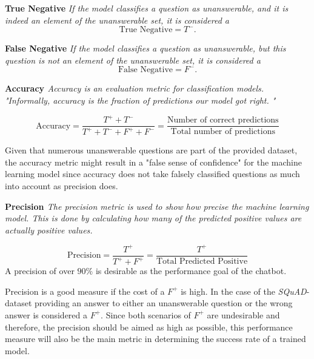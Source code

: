         \begin{tcolorbox}
            \textbf{True Negative}
            \textit{If the model classifies a question as unanswerable, and it is indeed an element of the unanswerable set, it is considered a}
            $$\text{True Negative} = T^-.$$
        \end{tcolorbox}

        \begin{tcolorbox}
            \textbf{False Negative}
            \textit{If the model classifies a question as unanswerable, but this question is not an element of the unanswerable set, it is considered a}
            $$\text{False Negative} = F^-.$$
        \end{tcolorbox}

        \begin{tcolorbox}
            \textbf{Accuracy \cite{googleClassificationAccuracy}}
            \textit{Accuracy is an evaluation metric for classification models. "Informally, accuracy is the fraction of predictions our model got right. \cite{googleClassificationAccuracy}"}

            $$\text{Accuracy} = \frac{T^+ + T^-}{T^+ + T^- + F^+ + F^-} = \frac{\text{Number of correct predictions}}{\text{Total number of predictions}}$$

            Given that numerous unanswerable questions are part of the provided dataset, the accuracy metric might result in a "false sense of confidence" for the machine learning model since accuracy does not take falsely classified questions as much into account as precision does.
        \end{tcolorbox}

        

        \begin{tcolorbox}
            \textbf{Precision \cite{koehrsenPrecisionRecall}}
            \textit{The precision metric is used to show how precise the machine learning model. 
                This is done by calculating how many of the predicted positive values are actually positive values.
            }

            $$\text{Precision} = \frac{T^+}{T^+ + F^+} = \frac{T^+}{\text{Total Predicted Positive}}$$
            A precision of over $90\%$ is desirable as the performance goal of the chatbot.
        \end{tcolorbox}
        
            Precision is a good measure if the cost of a $F^+$ is high. In the case of the \emph{SQuAD}-dataset providing an answer to either an unanswerable question or the wrong answer is considered a $F^+$.
            Since both scenarios of $F^+$ are undesirable and therefore, the precision should be aimed as high as possible, this performance measure will also be the main metric in determining the success rate of a trained model.


